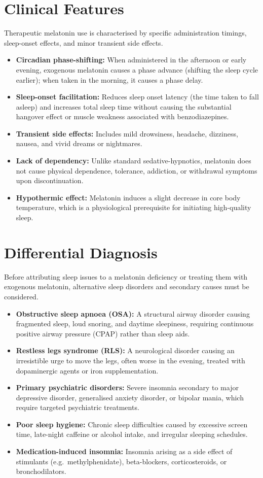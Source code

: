 \section*{Clinical Features}
Therapeutic melatonin use is characterised by specific administration timings, sleep-onset effects, and minor transient side effects.
\begin{itemize}
    \item \textbf{Circadian phase-shifting:} When administered in the afternoon or early evening, exogenous melatonin causes a phase advance (shifting the sleep cycle earlier); when taken in the morning, it causes a phase delay.
    \item \textbf{Sleep-onset facilitation:} Reduces sleep onset latency (the time taken to fall asleep) and increases total sleep time without causing the substantial hangover effect or muscle weakness associated with benzodiazepines.
    \item \textbf{Transient side effects:} Includes mild drowsiness, headache, dizziness, nausea, and vivid dreams or nightmares.
    \item \textbf{Lack of dependency:} Unlike standard sedative-hypnotics, melatonin does not cause physical dependence, tolerance, addiction, or withdrawal symptoms upon discontinuation.
    \item \textbf{Hypothermic effect:} Melatonin induces a slight decrease in core body temperature, which is a physiological prerequisite for initiating high-quality sleep.
\end{itemize}

\section*{Differential Diagnosis}
Before attributing sleep issues to a melatonin deficiency or treating them with exogenous melatonin, alternative sleep disorders and secondary causes must be considered.
\begin{itemize}
    \item \textbf{Obstructive sleep apnoea (OSA):} A structural airway disorder causing fragmented sleep, loud snoring, and daytime sleepiness, requiring continuous positive airway pressure (CPAP) rather than sleep aids.
    \item \textbf{Restless legs syndrome (RLS):} A neurological disorder causing an irresistible urge to move the legs, often worse in the evening, treated with dopaminergic agents or iron supplementation.
    \item \textbf{Primary psychiatric disorders:} Severe insomnia secondary to major depressive disorder, generalised anxiety disorder, or bipolar mania, which require targeted psychiatric treatments.
    \item \textbf{Poor sleep hygiene:} Chronic sleep difficulties caused by excessive screen time, late-night caffeine or alcohol intake, and irregular sleeping schedules.
    \item \textbf{Medication-induced insomnia:} Insomnia arising as a side effect of stimulants (e.g.\ methylphenidate), beta-blockers, corticosteroids, or bronchodilators.
\end{itemize}

